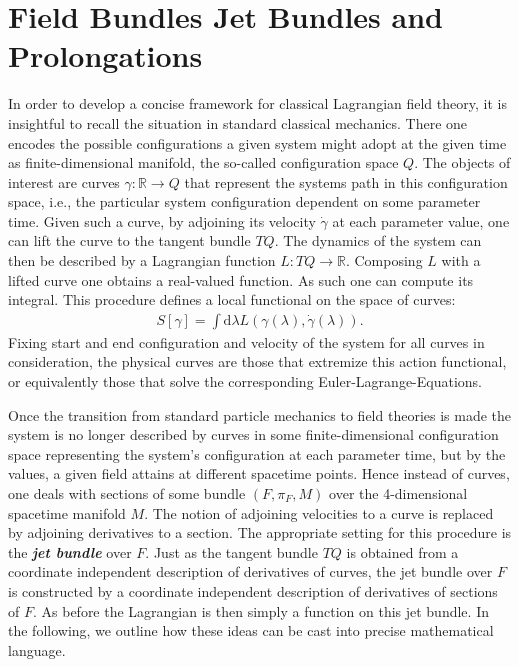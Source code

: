\documentclass[a4paper,12pt, DIV=14, BCOR=5mm, twoside, headsepline, numbers=noenddot]{scrbook}
\begin{document}
\section{Field Bundles Jet Bundles and Prolongations}
In order to develop a concise framework for classical Lagrangian field theory, it is insightful to recall the situation in standard classical mechanics. There one encodes the possible configurations a given system might adopt at the given time as finite-dimensional manifold, the so-called configuration space $Q$. The objects of interest are curves $\gamma : \mathbb{R} \rightarrow Q $ that represent the systems path in this configuration space, i.e., the particular system configuration dependent on some parameter time. Given such a curve, by adjoining its velocity $\dot{\gamma}$ at each parameter value, one can lift the curve to the tangent bundle $TQ$. The dynamics of the system can then be described by a Lagrangian function $L : TQ \rightarrow \mathbb{R}$. Composing $L$ with a lifted curve one obtains a real-valued function. As such one can compute its integral. This procedure defines a local functional on the space of curves:
\begin{align}
S[\gamma] = \int \mathrm{d}\lambda L(\gamma (\lambda), \dot{\gamma} (\lambda)).  
\end{align}
Fixing start and end configuration and velocity of the system for all curves in consideration, the physical curves are those that extremize this action functional, or equivalently those that solve the corresponding Euler-Lagrange-Equations. 

Once the transition from standard particle mechanics to field theories is made the system is no longer described by curves in some finite-dimensional configuration space representing the system's configuration at each parameter time, but by the values, a given field attains at different spacetime points. Hence instead of curves, one deals with sections of some bundle $(F,\pi_F,M)$ over the 4-dimensional spacetime manifold $M$. The notion of adjoining velocities to a curve is replaced by adjoining derivatives to a section. The appropriate setting for this procedure is the \textit{\textbf{jet bundle}} over $F$. Just as the tangent bundle $TQ$ is obtained from a coordinate independent description of derivatives of curves, the jet bundle over $F$ is constructed by a coordinate independent description of derivatives of sections of $F$. As before the Lagrangian is then simply a function on this jet bundle. 
In the following, we outline how these ideas can be cast into precise mathematical language. 
\end{document}
